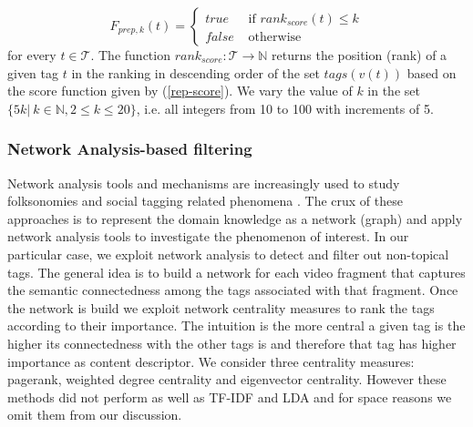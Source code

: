 \begin{equation}
F_{prep,k}(t) = \left\{ 
	\begin{array}{rl}
	true &\mbox{ if $rank_{score}(t) \leq k$} \\
	false &\mbox{ otherwise}
	\end{array}
\right.
\end{equation}
for every $t \in \mathcal{T}$. The function $rank_{score}: \mathcal{T} \rightarrow \mathbb{N}$ returns the  position (rank) of a given tag $t$ in the ranking in descending order of the set $tags(v(t))$ based on the score function given by (\ref{rep-score}). We vary the value of $k$ in the set $\{5k|~k\in \mathbb{N}, 2 \leq k \leq 20\}$, i.e. all integers from 10 to 100 with increments of 5.

\subsubsection{Network Analysis-based filtering}
Network analysis tools and mechanisms \cite{netan1,netan2} are increasingly used to study folksonomies and social tagging related phenomena \cite{jilung2011network,conf/csse/Wu08b,journals/corr/abs-cs-0509072,Mika:2007:OUU:1229184.1229195,ilprints775,conf/iics/BothorelB11}. The crux of these approaches is to  represent the domain knowledge as a network (graph) and apply network analysis tools to investigate the phenomenon of interest. In our particular case, we exploit network analysis to detect and filter out non-topical tags. The general idea is to build a network for each video fragment that captures the semantic connectedness among the tags associated with that fragment. Once the network is build we exploit network centrality measures to rank the tags according to their importance. The intuition is the more central a given tag is the higher its connectedness with the other tags is and therefore that tag has higher importance as content descriptor. We consider three centrality measures: pagerank, weighted degree centrality and eigenvector centrality. However these methods did not perform as well as TF-IDF and LDA and for space reasons we omit them from our discussion.  

